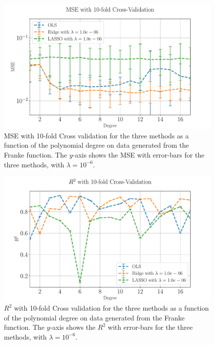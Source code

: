 \documentclass[%
reprint,
amsmath,amssymb,
aps,
pra,
]{revtex4-2}
\begin{document}
\begin{figure}[ht!]
	\centering
	\includegraphics[width=\linewidth]{Python/Figures/CV/CV_MSE_Unscaled_0.pdf}
	\caption{MSE with 10-fold Cross validation for the three methods as a function of the polynomial degree on data generated from the Franke function. The $y$-axis shows the MSE with error-bars for the three methods, with \(\lambda=10^{-6}\). }
	\label{fig:Franke_MSE_CV}
\end{figure}
\begin{figure}[ht!]
	\centering
	\includegraphics[width=\linewidth]{Python/Figures/CV/CV_R2_Unscaled_0.pdf}
	\caption{$R^2$ with 10-fold Cross validation for the three methods as a function of the polynomial degree on data generated from the Franke function. The $y$-axis shows the $R^2$ with error-bars for the three methods, with \(\lambda=10^{-6}\). }
	\label{fig:Franke_R2_CV}
\end{figure}
\end{document}
